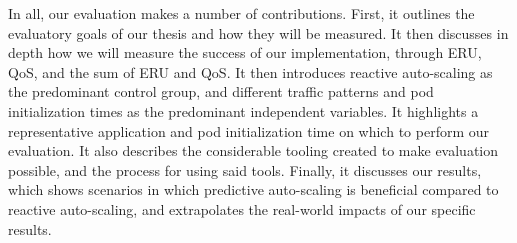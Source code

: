 In all, our evaluation makes a number of contributions. First, it outlines the
evaluatory goals of our thesis and how they will be measured. It then discusses
in depth how we will measure the success of our implementation, through ERU,
QoS, and the sum of ERU and QoS. It then introduces reactive auto-scaling as the
predominant control group, and different traffic patterns and pod initialization
times as the predominant
independent variables. It highlights a representative application and pod
initialization time on which to perform our evaluation. It also describes the
considerable tooling created to make evaluation possible, and the process for
using said tools. Finally, it discusses our results, which shows scenarios in
which predictive auto-scaling is
beneficial compared to reactive auto-scaling, and extrapolates the real-world
impacts of our specific results.
